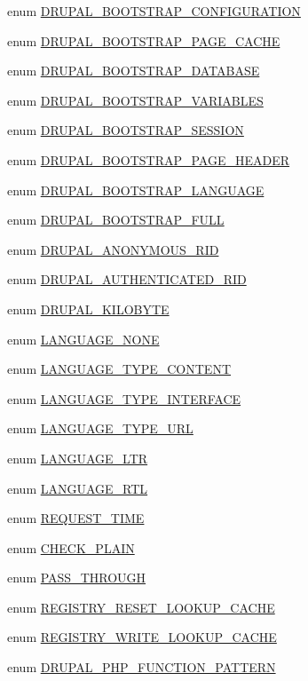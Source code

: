 \begin{DoxyCompactItemize}
enum \hyperlink{bootstrap_8inc_ad71394314c3ad7cef54b5f566e3ec177}{DRUPAL\_\-BOOTSTRAP\_\-CONFIGURATION} 
\item 
enum \hyperlink{bootstrap_8inc_a72f3a79e7308050a8f4d074592314c0f}{DRUPAL\_\-BOOTSTRAP\_\-PAGE\_\-CACHE} 
\item 
enum \hyperlink{bootstrap_8inc_a693d842eaaf448b1e6c37cc4ef068e3a}{DRUPAL\_\-BOOTSTRAP\_\-DATABASE} 
\item 
enum \hyperlink{bootstrap_8inc_a83083de674fde28341c7b833b9397390}{DRUPAL\_\-BOOTSTRAP\_\-VARIABLES} 
\item 
enum \hyperlink{bootstrap_8inc_aa6c510376f042cd2d05fc9bb458e7138}{DRUPAL\_\-BOOTSTRAP\_\-SESSION} 
\item 
enum \hyperlink{bootstrap_8inc_aa237aa5f95f8059a465efef6c72e49ce}{DRUPAL\_\-BOOTSTRAP\_\-PAGE\_\-HEADER} 
\item 
enum \hyperlink{bootstrap_8inc_ae4a0a1bc1243082285abc3fc052e5d38}{DRUPAL\_\-BOOTSTRAP\_\-LANGUAGE} 
\item 
enum \hyperlink{bootstrap_8inc_a2c8ac509af1924cf2fa7420a22e1b048}{DRUPAL\_\-BOOTSTRAP\_\-FULL} 
\item 
enum \hyperlink{bootstrap_8inc_ac7816037c6b6b794a56dcce4dea70569}{DRUPAL\_\-ANONYMOUS\_\-RID} 
\item 
enum \hyperlink{bootstrap_8inc_ac2d2d9cd4c8559510f9baa997525373e}{DRUPAL\_\-AUTHENTICATED\_\-RID} 
\item 
enum \hyperlink{bootstrap_8inc_ab6865363d0c783dee8dccbda9849de9f}{DRUPAL\_\-KILOBYTE} 
\item 
enum \hyperlink{bootstrap_8inc_a9e91e2136aa0ce5c5e80f06aa3ad8266}{LANGUAGE\_\-NONE} 
\item 
enum \hyperlink{bootstrap_8inc_a40466aefcfc6ea9766f1fedf53cb3a6d}{LANGUAGE\_\-TYPE\_\-CONTENT} 
\item 
enum \hyperlink{bootstrap_8inc_adcc8b40b0d1ee5cd37f1c7314cc541dc}{LANGUAGE\_\-TYPE\_\-INTERFACE} 
\item 
enum \hyperlink{bootstrap_8inc_aa234a385123b721683deb3bcbf072635}{LANGUAGE\_\-TYPE\_\-URL} 
\item 
enum \hyperlink{bootstrap_8inc_a8790965df4de009fe8bdcf17f6a5c738}{LANGUAGE\_\-LTR} 
\item 
enum \hyperlink{bootstrap_8inc_ac3c2ed4c787f238d2d39d644dbdcb6d4}{LANGUAGE\_\-RTL} 
\item 
enum \hyperlink{bootstrap_8inc_a08bcd0b03e31c17fb7d58786bef2b7f4}{REQUEST\_\-TIME} 
\item 
enum \hyperlink{bootstrap_8inc_a7b115778ff532867b7af4c53d39a1de2}{CHECK\_\-PLAIN} 
\item 
enum \hyperlink{bootstrap_8inc_a90c8d2e0e3b0f4acce7e88c8c60ddbca}{PASS\_\-THROUGH} 
\item 
enum \hyperlink{bootstrap_8inc_a6045f5b23cf5e2c5e6ed8a2effaa7bfb}{REGISTRY\_\-RESET\_\-LOOKUP\_\-CACHE} 
\item 
enum \hyperlink{bootstrap_8inc_ab6acafa683cd17da2d120b9faf3e04c2}{REGISTRY\_\-WRITE\_\-LOOKUP\_\-CACHE} 
\item 
enum \hyperlink{bootstrap_8inc_ac2b8a8a3549cb6839c538ebc812ecf8c}{DRUPAL\_\-PHP\_\-FUNCTION\_\-PATTERN} 
\end{DoxyCompactItemize}

